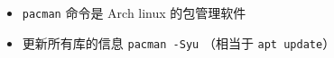 
\begin{issues}
\issueDraft
\end{issues}

\begin{itemize}
\item \verb|pacman| 命令是 Arch linux 的包管理软件
\item 更新所有库的信息 \verb|pacman -Syu| （相当于 \verb|apt update|）
\end{itemize}
